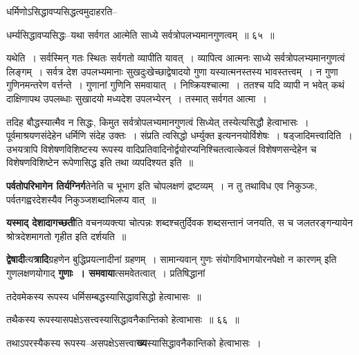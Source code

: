 \documentclass[article,12pt,a4paper]{memoir}
\begin{document}
	धर्मिणोऽसिद्धावप्यसिद्धत्वमुदाहरति--  
	  
	धर्म्यसिद्धावप्यसिद्धः--यथा सर्वगत आत्मेति साध्ये सर्वत्रोपलभ्यमानगुणत्वम् ॥ ६५ ॥ 
	  
	यथेति । सर्वस्मिन् गतः स्थितः सर्वगतो व्यापीति यावत् । व्यापित्व आत्मनः साध्ये सर्वत्रोपलभ्यमानगुणत्वं लिङ्गम् । सर्वत्र देश उपलभ्यमानाः सुखदुःखेच्छाद्वेषादयो गुणा यस्यात्मनस्तस्य भावस्तत्त्वम् । न गुणा गुणिनमन्तरेण वर्त्तन्ते । गुणानां गुणिनि समवायात् । निष्क्रियश्चात्मा । ततश्च यदि व्यापी न भवेत् कथं दाक्षिणापथ उपलब्धाः सुखादयो मध्यदेश उपलभ्येरन् । तस्मात् सर्वगत आत्मा ।  
	  
	तदिह बौद्धस्यात्मैव न सिद्धः, किमुत सर्वत्रोपलभ्यमानगुणत्वं सिध्येत् तस्येत्यसिद्धौ हेत्वाभासः । पूर्वमाश्रयणसंदेहेन धर्मिणि संदेह उक्तः । संप्रति त्वसिद्धो धर्म्युक्त इत्यननयोर्विशेषः । षड्जादिमत्त्वादिति । उभयत्रापि विशेषणविशिष्टस्य रूपस्य वादिप्रतिवादिनोर्द्वयोरप्यनिश्चितत्वात्केवलं विशेषणसन्देहेन च विशेषणविशिष्टेन रूपेणासिद्ध इति तथा व्यपदिश्यत इति ॥
	\pend
      

	  \pstart \textbf{पर्वतोपरिभागेन तिर्यग्निर्ग}तेनेति च भूभाग इति चोपलक्षणं द्रष्टव्यम् । न तु तथाविध एव निकुञ्जः, पर्वतगह्वरदेशस्यैव निकुञ्जशब्दाभिलप्य वात् ॥
	\pend
      

	  \pstart \textbf{यस्माद् देशादागच्छती}ति वचनव्यक्त्या चोत्पन्नः शब्दश्चतुर्दिवक शब्दसन्तानं जनयति, स च जलतरङ्गन्यायेन श्रोत्रदेशमागतो गृहीत इति दर्शयति ॥
	\pend
      

	  \pstart \textbf{द्वेषादी}त्य\textbf{त्रादि}ग्रहणेन बुद्धिप्रयत्नादीनां ग्रहणम् । सामान्यवान् गुणः संयोगविभागयोरनपेक्षो न कारणम् इति गुणलक्षणयोगाद् \textbf{गुणाः । समवाया}त्समवेतत्वात् । प्रतिषिद्धानां  \leavevmode{} 
	  
	तदेवमेकस्य रूपस्य धर्मिसम्बद्धस्यासिद्धावसिद्धो हेत्वाभासः ॥  
	  
	तथैकस्य रूपस्यासपक्षेऽसत्त्वस्यासिद्धावनैकान्तिको हेत्वाभासः ॥ ६६ ॥ 
	  
	तथाऽपरस्यैकस्य रूपस्य--असपक्षेऽसत्त्वा\textbf{ख्य}स्यासिद्धावनैकान्तिको हेत्वाभासः ।  
	  
\end{document}
